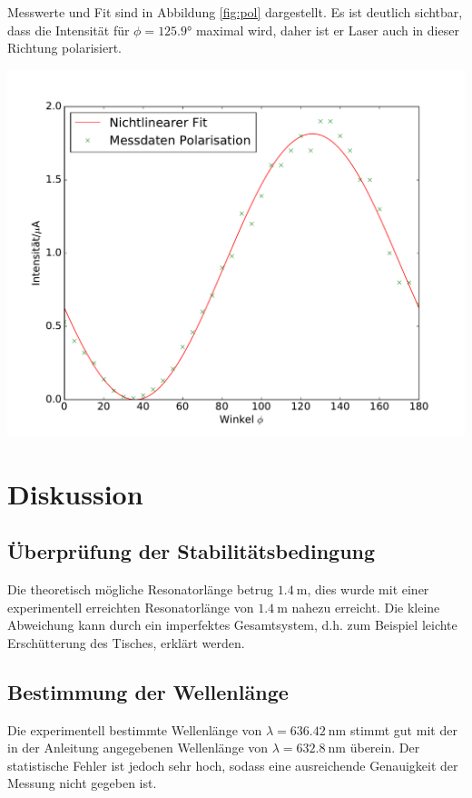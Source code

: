 \documentclass[]{scrartcl}
\begin{document}
Messwerte und Fit sind in Abbildung \ref{fig:pol} dargestellt. Es ist deutlich sichtbar, dass die Intensität für $\phi=\ang{125.9}$ maximal wird, daher ist er Laser auch in dieser Richtung polarisiert.
\begin{center}
 	\includegraphics[width=\textwidth]{images/polarisation.pdf}
 	\label{fig:pol}
\end{center}

\section{Diskussion}

\subsection{Überprüfung der Stabilitätsbedingung}
Die theoretisch mögliche Resonatorlänge betrug $\SI{1.4}{\metre}$, dies wurde mit einer experimentell erreichten Resonatorlänge von $\SI{1.4}{\metre}$ nahezu erreicht. Die kleine Abweichung kann durch ein imperfektes Gesamtsystem, d.h. zum Beispiel leichte Erschütterung des Tisches, erklärt werden.

\subsection{Bestimmung der Wellenlänge}
Die experimentell bestimmte Wellenlänge von $\lambda = \SI{636.42}{\nano\metre}$ stimmt gut mit der in der Anleitung angegebenen Wellenlänge von $\lambda = \SI{632.8}{\nano\metre}$ überein. Der statistische Fehler ist jedoch sehr hoch, sodass eine ausreichende Genauigkeit der Messung nicht gegeben ist.
\end{document}
